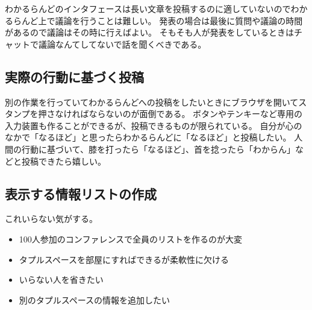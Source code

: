 わかるらんどのインタフェースは長い文章を投稿するのに適していないのでわかるらんど上で議論を行うことは難しい。
発表の場合は最後に質問や議論の時間があるので議論はその時に行えばよい。
そもそも人が発表をしているときはチャットで議論なんてしてないで話を聞くべきである。

\subsection{実際の行動に基づく投稿}

別の作業を行っていてわかるらんどへの投稿をしたいときにブラウザを開いてスタンプを押さなければならないのが面倒である。
ボタンやテンキーなど専用の入力装置も作ることができるが、投稿できるものが限られている。
自分が心のなかで「なるほど」と思ったらわかるらんどに「なるほど」と投稿したい。
人間の行動に基づいて、膝を打ったら「なるほど」、首を捻ったら「わからん」などと投稿できたら嬉しい。

\subsection{表示する情報リストの作成}

これいらない気がする。

\begin{itemize}
\item 100人参加のコンファレンスで全員のリストを作るのが大変
\item タプルスペースを部屋にすればできるが柔軟性に欠ける
\item いらない人を省きたい
\item 別のタプルスペースの情報を追加したい
\end{itemize}